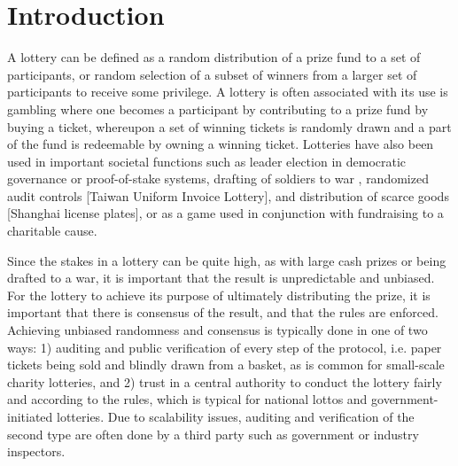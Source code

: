 \chapter{Introduction}
\label{chap:introduction}

A lottery can be defined as a random distribution of a prize fund to a set of participants, or random selection of a subset of winners from a larger set of participants to receive some privilege. A lottery is often associated with its use is gambling where one becomes a participant by contributing to a prize fund by buying a ticket, whereupon a set of winning tickets is randomly drawn and a part of the fund is redeemable by owning a winning ticket. Lotteries have also been used in important societal functions such as leader election in democratic governance \cite{sintomer_random_2010} or proof-of-stake systems, drafting of soldiers to war \cite{nixon_executive_1969}, randomized audit controls [Taiwan Uniform Invoice Lottery], and distribution of scarce goods [Shanghai license plates], or as a game used in conjunction with fundraising to a charitable cause. 

Since the stakes in a lottery can be quite high, as with large cash prizes or being drafted to a war, it is important that the result is unpredictable and unbiased. For the lottery to achieve its purpose of ultimately distributing the prize, it is important that there is consensus of the result, and that the rules are enforced. Achieving unbiased randomness and consensus is typically done in one of two ways: 1) auditing and public verification of every step of the protocol, i.e. paper tickets being sold and blindly drawn from a basket, as is common for small-scale charity lotteries, and 2) trust in a central authority to conduct the lottery fairly and according to the rules, which is typical for national lottos and government-initiated lotteries. Due to scalability issues, auditing and verification of the second type are often done by a third party such as government or industry inspectors.

